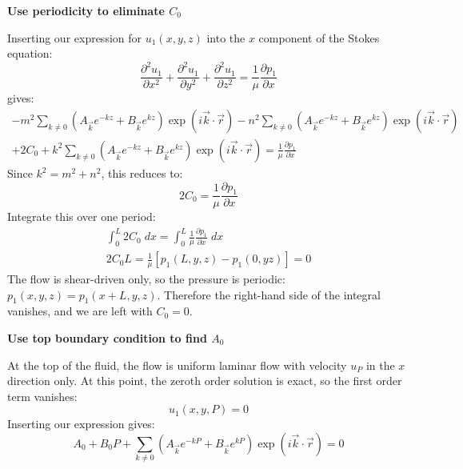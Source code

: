 \documentclass[12pt, a4paper, twoside, openright]{book}
\begin{document}
\textbf{Use periodicity to eliminate $C_0$}

Inserting our expression for $u_1(x,y,z)$ into the $x$ component of the Stokes equation:
\begin{equation}
\frac{\partial^2 u_1}{\partial x^2} + \frac{\partial^2 u_1}{\partial y^2} +
\frac{\partial^2 u_1}{\partial z^2} =
\frac{1}{\mu} \frac{\partial p_1}{\partial x}
\end{equation}
gives:
\begin{multline}
- m^2
\sum_{k \neq 0} 
\left(  A_{\vec{k}} e^{-kz} + B_{\vec{k}} e^{kz} \right)
\exp(i \vec{k}\cdot \vec{r})
- n^2
\sum_{k \neq 0} 
\left(  A_{\vec{k}} e^{-kz} + B_{\vec{k}} e^{kz} \right)
\exp(i \vec{k}\cdot \vec{r}) \\
+ 2 C_0
+ k^2
\sum_{k \neq 0} 
\left(  A_{\vec{k}} e^{-kz} + B_{\vec{k}} e^{kz} \right)
\exp(i \vec{k}\cdot \vec{r})
= \frac{1}{\mu} \frac{\partial p_1}{\partial x}
\end{multline}
Since $k^2 = m^2 + n^2$, this reduces to:
\begin{equation}
2 C_0 = \frac{1}{\mu} \frac{\partial p_1}{\partial x}
\end{equation}
Integrate this over one period:
\begin{gather}
\int_0^L 2 C_0 \;dx = \int_0^L \frac{1}{\mu} \frac{\partial p_1}{\partial x} \;dx \\
2 C_0 L = \frac{1}{\mu} [ p_1(L,y,z) - p_1(0,yz) ] = 0
\end{gather}
The flow is shear-driven only, so the pressure is periodic: $p_1(x,y,z) = p_1(x+L,y,z)$.  Therefore the right-hand side of the integral vanishes, and we are left with $C_0 = 0$.

\vspace{1em}
\textbf{Use top boundary condition to find $A_0$}

At the top of the fluid, the flow is uniform laminar flow with velocity $u_P$ in the $x$ direction only.  At this point, the zeroth order solution is exact, so the first order term vanishes:
\begin{equation}
u_1(x,y,P) = 0
\end{equation} 
Inserting our expression gives:
\begin{equation}
A_0 + B_0 P + \sum_{k \neq 0} 
\left(  A_{\vec{k}} e^{-kP} + B_{\vec{k}} e^{kP} \right)
\exp(i \vec{k}\cdot \vec{r})
= 0
\end{equation}

\end{document}
